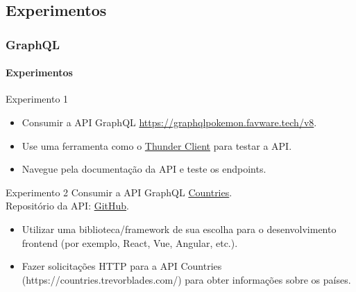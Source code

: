 \documentclass[
	9pt, %
	t, %
]{beamer}
\begin{document}
\subsection{Experimentos}

\begin{frame}
	\frametitle{GraphQL}
	\framesubtitle{Experimentos}
	{\small
		\begin{block}{Experimento 1}
			\begin{itemize}
				\item Consumir a API GraphQL
				      \href{https://graphqlpokemon.favware.tech/v8}{https://graphqlpokemon.favware.tech/v8}.
				\item Use uma ferramenta como o \href{https://www.thunderclient.com/}{Thunder Client}
				      para testar a API.
				\item Navegue pela documentação da API e teste os endpoints.
			\end{itemize}
		\end{block}

		\begin{block}{Experimento 2}
			Consumir a API GraphQL \href{https://countries.trevorblades.com/}{Countries}. \\
			Repositório da API: \href{https://github.com/trevorblades/countries}{GitHub}.
			\begin{itemize}
				\item Utilizar uma biblioteca/framework de sua escolha para o desenvolvimento
				      frontend (por exemplo, React, Vue, Angular, etc.).
				\item Fazer solicitações HTTP para a API Countries
				      (https://countries.trevorblades.com/) para obter informações sobre os países.
			\end{itemize}
		\end{block}
	}

\end{frame}
\end{document}
